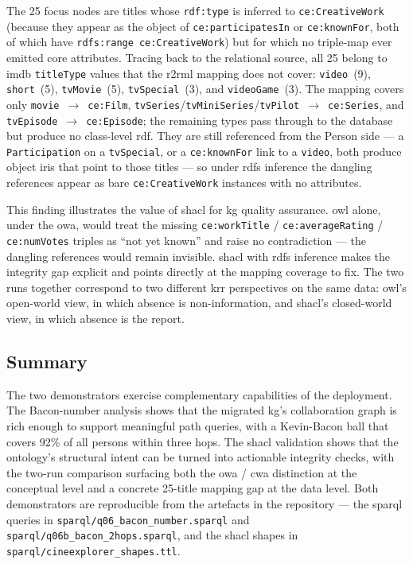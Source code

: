 \begin{sloppypar}
The 25 focus nodes are titles whose \texttt{rdf:type} is inferred to \texttt{ce:CreativeWork} (because they appear as the object of \texttt{ce:participatesIn} or \texttt{ce:knownFor}, both of which have \texttt{rdfs:range}~\texttt{ce:CreativeWork}) but for which no triple-map ever emitted core attributes. Tracing back to the relational source, all 25 belong to \ac{imdb} \texttt{titleType} values that the \ac{r2rml} mapping does not cover: \texttt{video}~(9), \texttt{short}~(5), \texttt{tvMovie}~(5), \texttt{tvSpecial}~(3), and \texttt{videoGame}~(3). The mapping covers only \texttt{movie}~$\to$~\texttt{ce:Film}, \texttt{tvSeries}/\texttt{tvMiniSeries}/\texttt{tvPilot}~$\to$~\texttt{ce:Series}, and \texttt{tvEpisode}~$\to$~\texttt{ce:Episode}; the remaining types pass through to the database but produce no class-level \ac{rdf}. They are still referenced from the Person side --- a \texttt{Participation} on a \texttt{tvSpecial}, or a \texttt{ce:knownFor} link to a \texttt{video}, both produce object \acp{iri} that point to those titles --- so under \ac{rdfs} inference the dangling references appear as bare \texttt{ce:CreativeWork} instances with no attributes.

This finding illustrates the value of \ac{shacl} for \ac{kg} quality assurance. \ac{owl} alone, under the \ac{owa}, would treat the missing \texttt{ce:workTitle} / \texttt{ce:averageRating} / \texttt{ce:numVotes} triples as ``not yet known'' and raise no contradiction --- the dangling references would remain invisible. \ac{shacl} with \ac{rdfs} inference makes the integrity gap explicit and points directly at the mapping coverage to fix. The two runs together correspond to two different \ac{krr} perspectives on the same data: \ac{owl}'s open-world view, in which absence is non-information, and \ac{shacl}'s closed-world view, in which absence is the report.
\end{sloppypar}

\subsection{Summary}

The two demonstrators exercise complementary capabilities of the deployment. The Bacon-number analysis shows that the migrated \ac{kg}'s collaboration graph is rich enough to support meaningful path queries, with a Kevin-Bacon ball that covers 92\% of all persons within three hops. The \ac{shacl} validation shows that the ontology's structural intent can be turned into actionable integrity checks, with the two-run comparison surfacing both the \ac{owa} / \ac{cwa} distinction at the conceptual level and a concrete 25-title mapping gap at the data level. Both demonstrators are reproducible from the artefacts in the repository --- the \ac{sparql} queries in \texttt{sparql/q06\_bacon\_number.sparql} and \texttt{sparql/q06b\_bacon\_2hops.sparql}, and the \ac{shacl} shapes in \texttt{sparql/cineexplorer\_shapes.ttl}.
